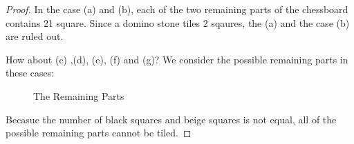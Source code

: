 \documentclass[12pt,a4]{article}
\theoremstyle{exercise}
\begin{document}
\begin{proof}
    In the case (a) and (b), each of the two remaining parts of the chessboard contains 21 square.
    Since a domino stone tiles 2 sqaures, the  (a) and the case (b) are ruled out.

    How about (c) ,(d), (e), (f) and (g)? We consider the possible remaining parts in these cases:

    \begin{figure}[H]
        \centering
	\label{fig:leftPart}
	\caption{The Remaining Parts}
    \end{figure}

    Becasue the number of black squares and beige squares is not equal, all of the possible remaining parts cannot be tiled.

\end{proof}
\end{document}

